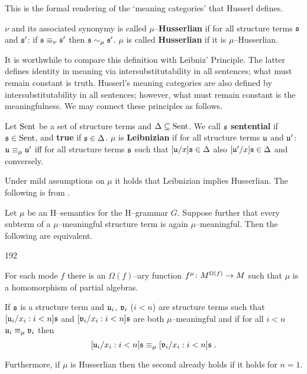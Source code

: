This is the formal rendering of the `meaning categories' that
Husserl defines.
\begin{defn}
$\nu$ and its associated synonymy is called $\mu$--\textbf{Husserlian}
if for all structure terms $\mathfrak{s}$ and $\mathfrak{s}'$: if $\mathfrak{s} \equiv_{\nu}
\mathfrak{s}'$ then $\mathfrak{s} \sim_{\mu} \mathfrak{s}'$. $\mu$ is called
\textbf{Husserlian} if it is $\mu$--Husserlian.
\end{defn}
It is worthwhile to compare this definition with Leibniz' Principle.
The latter defines identity in meaning via intersubstitutability
in all sentences; what must remain constant is truth. Husserl's meaning
categories are also defined by intersubstitutability in all sentences;
however, what must remain constant is the meaningfulness. We may connect
these principles as follows.
\begin{defn}
Let $\operatorname{Sent}$ be a set of structure terms and $\Delta 
\subseteq \operatorname{Sent}$. We call $\mathfrak{s}$ \textbf{sentential}
if $\mathfrak{s} \in \operatorname{Sent}$, and \textbf{true} if $\mathfrak{s} \in \Delta$. $\mu$ is
\textbf{Leibnizian} if for all structure terms $\mathfrak{u}$ and $\mathfrak{u}'$:
$\mathfrak{u} \equiv_{\mu} \mathfrak{u}'$ iff for all structure terms $\mathfrak{s}$
such that $[\mathfrak{u}/x]\mathfrak{s} \in \Delta$ also $[\mathfrak{u}'/x]\mathfrak{s}  \in \Delta$
and conversely.
\end{defn}
Under mild assumptions on $\mu$ it holds that Leibnizian
implies Husserlian. The following is from
\cite{hodges:compositionality}.
\begin{thm}[Hodges]
\label{thm:hodges}%
Let $\mu$ be an H--semantics for the H--grammar $G$. Suppose
further that every subterm of a $\mu$--meaningful structure term is
again $\mu$--meaningful. Then the following are equivalent.
\begin{dingautolist}{192}
\item
For each mode $f$ there is an $\Omega(f)$--ary function $f^{\mu} \colon
M^{\Omega(f)} \rightarrow M$ such that $\mu$ is a homomorphism of partial
algebras.
\item
If $\mathfrak{s}$ is a structure term and $\mathfrak{u}_i$, $\mathfrak{v}_i$ ($i < n$) are
structure terms such that $[\mathfrak{u}_i/x_i : i < n]\mathfrak{s}$ and
$[\mathfrak{v}_i/x_i : i < n]\mathfrak{s}$ are both $\mu$--meaningful and if
for all $i < n$ $\mathfrak{u}_i \equiv_{\mu} \mathfrak{v}_i$ then
$$[\mathfrak{u}_i/x_i : i < n]\mathfrak{s} \equiv_{\mu} [\mathfrak{v}_i/x_i : i < n]\mathfrak{s}\; .$$
\end{dingautolist}
Furthermore, if $\mu$ is Husserlian then the second already
holds if it holds for $n = 1$.
\end{thm}
